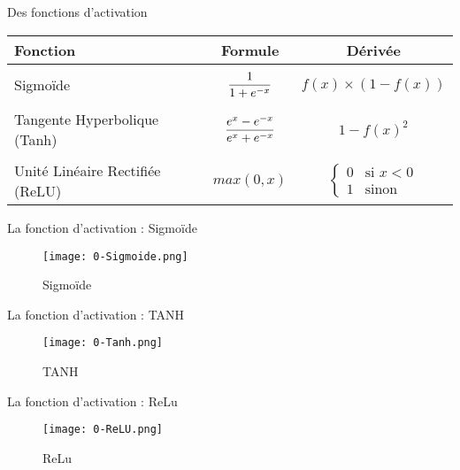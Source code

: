 \begin{frame}{Des fonctions d'activation}
    \begin{block}{}
        \centering
        \begin{tabular}{ l || c | c | }
            Fonction                        & Formule                                          & Dérivée                                     \\ \hline \\
            Sigmoïde                        & $\mathlarger{\frac{1}{1+e^{-x}}}$                & $f(x) \times (1-f(x))$                      \\ \\
            Tangente Hyperbolique (Tanh)    & $\mathlarger{\frac{e^{x}-e^{-x}}{e^{x}+e^{-x}}}$ & $1-f(x)^2$                                  \\ \\
            Unité Linéaire Rectifiée (ReLU) & $max(0, x)$                                      & $ \left\{\begin{array}{ll}
                    0 & \mbox{si } x<0 \\
                    1 & \mbox{sinon }\end{array}\right.$ \\
        \end{tabular}
    \end{block}
\end{frame}

\begin{frame}{La fonction d'activation : Sigmoïde}
    \begin{figure}
        \centering
        \texttt{[image: 0-Sigmoide.png]}
        \caption{Sigmoïde}
    \end{figure}
\end{frame}

\begin{frame}{La fonction d'activation : TANH}
    \begin{figure}
        \centering
        \texttt{[image: 0-Tanh.png]}
        \caption{TANH}
    \end{figure}
\end{frame}

\begin{frame}{La fonction d'activation : ReLu}
    \begin{figure}
        \centering
        \texttt{[image: 0-ReLU.png]}
        \caption{ReLu}
    \end{figure}
\end{frame}

